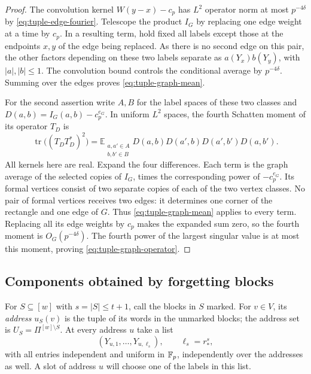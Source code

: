 \begin{proof}
The convolution kernel $W(y-x)-c_p$ has $L^2$ operator norm at most
$p^{-4\delta}$ by \eqref{eq:tuple-edge-fourier}.  Telescope the product
$I_G$ by replacing one edge weight at a time by $c_p$.  In a resulting
term, hold fixed all labels except those at the endpoints $x,y$ of the
edge being replaced.  As there is no second edge on this pair, the other
factors depending on these two labels separate as $a(Y_x)b(Y_y)$,
with $|a|,|b|\le1$.  The convolution bound controls the conditional
average by $p^{-4\delta}$.  Summing over the edges proves
\eqref{eq:tuple-graph-mean}.

For the second assertion write $A,B$ for the label spaces of these two classes and
$D(a,b)=I_G(a,b)-c_p^{e_G}$.  In uniform $L^2$ spaces, the fourth
Schatten moment of its operator $T_D$ is
\[
 \operatorname{tr}\bigl((T_DT_D^*)^2\bigr)
 =\mathbb E_{\substack{a,a'\in A\\b,b'\in B}}
   D(a,b)D(a',b)D(a',b')D(a,b').
\]
All kernels here are real.  Expand the four differences.  Each term is
the graph average of the selected copies of $I_G$, times the corresponding
power of $-c_p^{e_G}$.  Its formal vertices consist of two separate
copies of each of the two vertex classes.  No pair of formal vertices receives two
edges: it determines one corner of the rectangle and one edge of $G$.
Thus \eqref{eq:tuple-graph-mean} applies to every term.  Replacing all its
edge weights by $c_p$ makes the expanded sum zero, so the fourth moment
is $O_G(p^{-4\delta})$.  The fourth power of the largest singular value
is at most this moment, proving \eqref{eq:tuple-graph-operator}.
\end{proof}

\subsection{Components obtained by forgetting blocks}

For $S\subseteq[w]$ with $s=|S|\le t+1$, call the blocks in $S$
marked.  For $v\in V$, its \emph{address} $u_S(v)$ is the tuple of its
words in the unmarked blocks; the address set is
$U_S=\Pi^{[w]\setminus S}$.  At every address $u$ take a list
\[
 (Y_{u,1},\ldots,Y_{u,\ell_s}),\qquad \ell_s=r_*^s,
\]
with all entries independent and uniform in $\mathbb F_p$, independently
over the addresses as well.  A slot of address $u$ will choose one of
the labels in this list.

